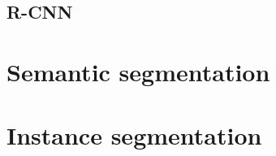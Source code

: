 \subsection{R-CNN}
\label{r-cnn}


\section{Semantic segmentation}
\label{semantic-segmentation}


\section{Instance segmentation}
\label{instance-segmentation}


